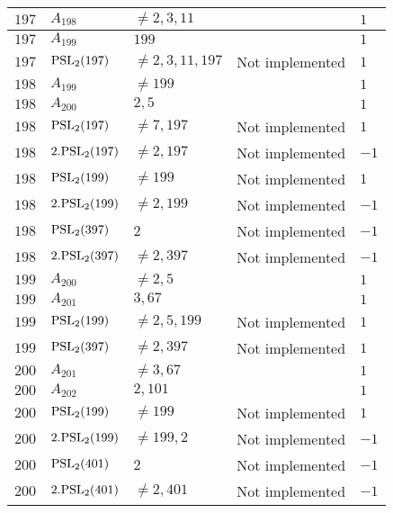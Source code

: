 \documentclass[a4paper, 11pt]{article}
\begin{document}
\begin{longtable}{lllll}
        $ 197 $ & $ A_{198} $ & $ \neq 2, 3, 11 $ & $ ~ $ & $ 1  $ \\ \hline
        $ 197 $ & $ A_{199} $ & $ 199 $ & $ ~ $ & $ 1  $ \\ \hline
        $ 197 $ & $ {\rm PSL}_{2}(197) $ & $ \neq 2, 3, 11, 197 $ & Not implemented & $ 1  $ \\ \hline
        $ 198 $ & $ A_{199} $ & $ \neq 199 $ & $ ~ $ & $ 1  $ \\ \hline
        $ 198 $ & $ A_{200} $ & $ 2, 5 $ & $ ~ $ & $ 1  $ \\ \hline
        $ 198 $ & $ {\rm PSL}_{2}(197) $ & $ \neq 7, 197 $ & Not implemented & $ 1  $ \\ \hline
        $ 198 $ & $ 2.{\rm PSL}_{2}(197) $ & $ \neq 2, 197 $ & Not implemented & $ -1  $ \\ \hline
        $ 198 $ & $ {\rm PSL}_{2}(199) $ & $ \neq 199 $ & Not implemented & $ 1  $ \\ \hline
        $ 198 $ & $ 2.{\rm PSL}_{2}(199) $ & $ \neq 2, 199 $ & Not implemented & $ -1  $ \\ \hline
        $ 198 $ & $ {\rm PSL}_{2}(397) $ & $ 2 $ & Not implemented & $ -1  $ \\ \hline
        $ 198 $ & $ 2.{\rm PSL}_{2}(397) $ & $ \neq 2, 397 $ & Not implemented & $ -1  $ \\ \hline
        $ 199 $ & $ A_{200} $ & $ \neq 2, 5 $ & $ ~ $ & $ 1  $ \\ \hline
        $ 199 $ & $ A_{201} $ & $ 3, 67 $ & $ ~ $ & $ 1  $ \\ \hline
        $ 199 $ & $ {\rm PSL}_{2}(199) $ & $ \neq 2, 5, 199 $ & Not implemented & $ 1  $ \\ \hline
        $ 199 $ & $ {\rm PSL}_{2}(397) $ & $ \neq 2, 397 $ & Not implemented & $ 1  $ \\ \hline
        $ 200 $ & $ A_{201} $ & $ \neq 3, 67 $ & $ ~ $ & $ 1  $ \\ \hline
        $ 200 $ & $ A_{202} $ & $ 2, 101 $ & $ ~ $ & $ 1  $ \\ \hline
        $ 200 $ & $ {\rm PSL}_{2}(199) $ & $ \neq 199 $ & Not implemented & $ 1  $ \\ \hline
        $ 200 $ & $ 2.{\rm PSL}_{2}(199) $ & $ \neq 199, 2 $ & Not implemented & $ -1  $ \\ \hline
        $ 200 $ & $ {\rm PSL}_{2}(401) $ & $ 2 $ & Not implemented & $ -1  $ \\ \hline
        $ 200 $ & $ 2.{\rm PSL}_{2}(401) $ & $ \neq 2, 401 $ & Not implemented & $ -1  $ \\ \hline

\end{longtable}
\end{document}
